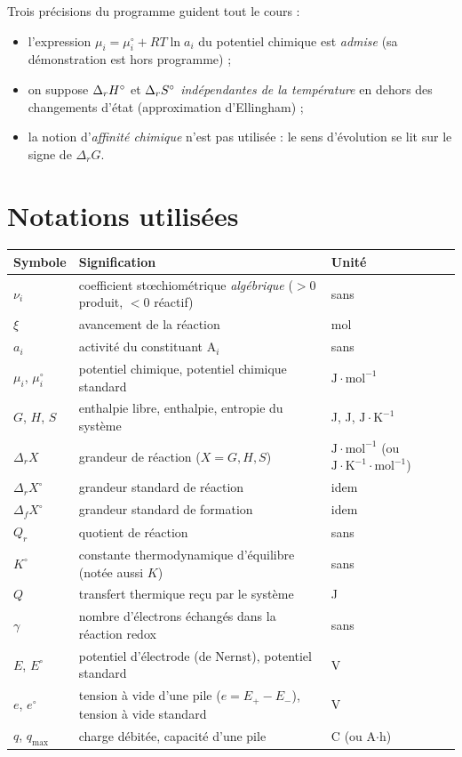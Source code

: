 \noindent Trois précisions du programme guident tout le cours :
\begin{itemize}
  \item l'expression $\mu_i=\mu_i^\circ+RT\ln a_i$ du potentiel chimique est \emph{admise} (sa démonstration est hors programme) ;
  \item on suppose $\Delta_r H^\circ$ et $\Delta_r S^\circ$ \emph{indépendantes de la température} en dehors des changements d'état (approximation d'Ellingham) ;
  \item la notion d'\emph{affinité chimique} n'est pas utilisée : le sens d'évolution se lit sur le signe de $\Delta_rG$.
\end{itemize}

\section*{Notations utilisées}

\renewcommand{\arraystretch}{1.25}
\begin{xltabular}{\linewidth}{>{\centering\arraybackslash}p{2.2cm} X >{\centering\arraybackslash}p{3.2cm}}
\toprule
\textbf{Symbole} & \textbf{Signification} & \textbf{Unité} \\ \midrule
$\nu_i$ & coefficient stœchiométrique \emph{algébrique} ($>0$ produit, $<0$ réactif) & sans \\
$\xi$ & avancement de la réaction & mol \\
$a_i$ & activité du constituant $\mathrm{A}_i$ & sans \\
$\mu_i$, $\mu_i^\circ$ & potentiel chimique, potentiel chimique standard & $\mathrm{J\cdot mol^{-1}}$ \\
$G$, $H$, $S$ & enthalpie libre, enthalpie, entropie du système & J, J, $\mathrm{J\cdot K^{-1}}$ \\
$\Delta_r X$ & grandeur de réaction ($X = G, H, S$) & $\mathrm{J\cdot mol^{-1}}$ (ou $\mathrm{J\cdot K^{-1}\cdot mol^{-1}}$) \\
$\Delta_r X^\circ$ & grandeur standard de réaction & idem \\
$\Delta_f X^\circ$ & grandeur standard de formation & idem \\
$Q_r$ & quotient de réaction & sans \\
$K^\circ$ & constante thermodynamique d'équilibre (notée aussi $K$) & sans \\
$Q$ & transfert thermique reçu par le système & J \\
$\gamma$ & nombre d'électrons échangés dans la réaction redox & sans \\
$E$, $E^\circ$ & potentiel d'électrode (de Nernst), potentiel standard & V \\
$e$, $e^\circ$ & tension à vide d'une pile ($e=E_+-E_-$), tension à vide standard & V \\
$q$, $q_{\max}$ & charge débitée, capacité d'une pile & C (ou A$\cdot$h) \\
\bottomrule
\end{xltabular}

